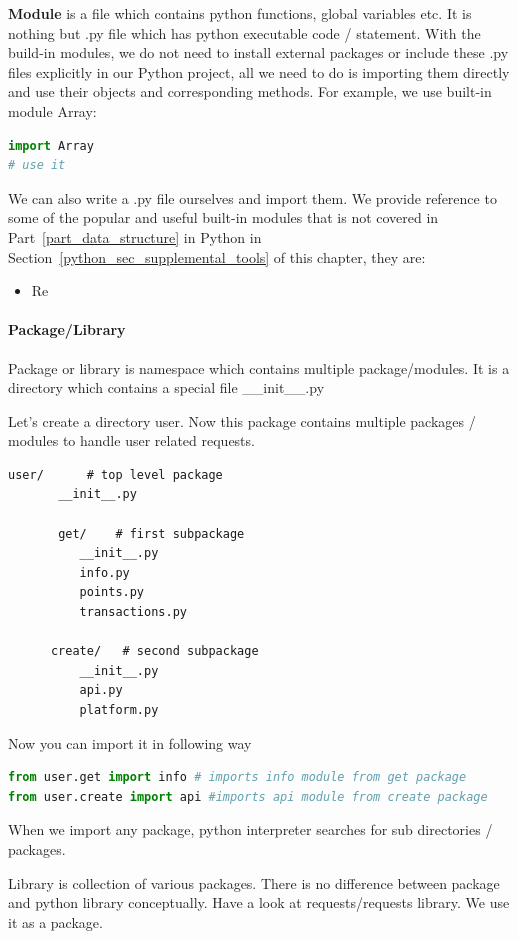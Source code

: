 \documentclass[../main.tex]{subfiles}
\begin{document}
\textbf{Module} is a file which contains python functions, global variables etc. It is nothing but .py file which has python executable code / statement. With the build-in modules, we do not need to install external packages or include these .py files explicitly in our Python project, all we need to do is importing them directly and use their objects and corresponding methods. For example, we use built-in module Array:
\begin{lstlisting}[language=Python]
import Array
# use it
\end{lstlisting}
We can also write a .py file ourselves and import them. We provide reference to some of the popular and useful built-in modules  that is not covered in Part~\ref{part_data_structure} in Python in Section~\ref{python_sec_supplemental_tools} of this chapter, they are:
\begin{itemize}
    \item Re
\end{itemize}


\paragraph{Package/Library} Package or library is namespace which contains multiple package/modules. It is a directory which contains a special file \_\_init\_\_.py

Let’s create a directory user. Now this package contains multiple packages / modules to handle user related requests.
\begin{lstlisting}[numbers=none]
    user/      # top level package
       __init__.py
     
       get/    # first subpackage
          __init__.py
          info.py
          points.py
          transactions.py
     
      create/   # second subpackage
          __init__.py
          api.py
          platform.py

\end{lstlisting}

Now you can import it in following way
\begin{lstlisting}[language=Python]
from user.get import info # imports info module from get package
from user.create import api #imports api module from create package 
\end{lstlisting}

When we import any package, python interpreter searches for sub directories / packages.

Library is collection of various packages. There is no difference between package and python library conceptually. Have a look at requests/requests library. We use it as a package.
\end{document}
